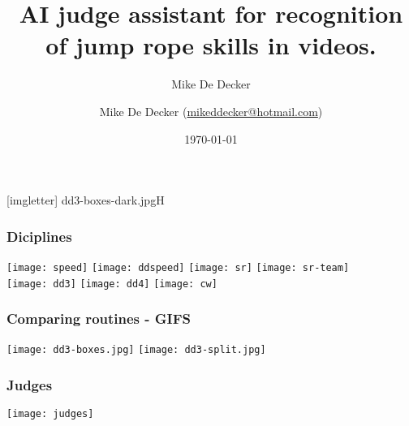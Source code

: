 \documentclass[aspectratio=169]{beamer}
\title[AI Judge]{AI judge assistant for recognition of jump rope skills in videos.}
\author{Mike De Decker}
\author[MDD]{Mike {De Decker} (\href{mailto:mikeddecker@hotmail.com}
    {mikeddecker@hotmail.com})}
\date{\today}
\begin{document}

{
[imgletter]
    {dd3-boxes-dark.jpg}{H}

\begin{frame}
    \maketitle
\end{frame}
}


\begin{frame}
  \frametitle{Diciplines}

  \hspace{0.1cm}\texttt{[image: speed]}
  \hspace{0.1cm}\texttt{[image: ddspeed]}
  \hspace{0.1cm}\texttt{[image: sr]}
  \hspace{0.1cm}\texttt{[image: sr-team]} \\
  \vspace{0.1cm}
  \hspace{0.1cm}\texttt{[image: dd3]}
  \hspace{0.1cm}\texttt{[image: dd4]}
  \hspace{0.1cm}\texttt{[image: cw]}

\end{frame}

\begin{frame}
  \frametitle{Comparing routines - GIFS}

  \texttt{[image: dd3-boxes.jpg]}
  \texttt{[image: dd3-split.jpg]}

\end{frame}

\begin{frame}
  \frametitle{Judges}
  \vspace{-1cm}
  \texttt{[image: judges]}
  
\end{frame}
\end{document}
